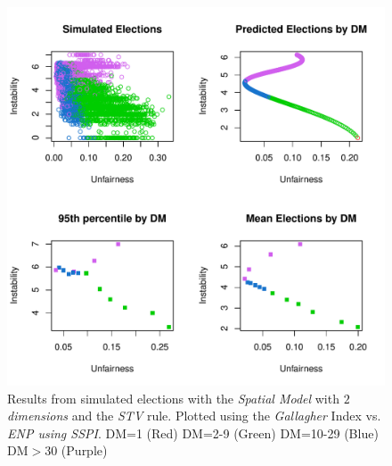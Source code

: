 \documentclass{article}
\begin{document}
\begin{figure}[]
\includegraphics[scale=1.00]{images/stv_spatial2_gallagher_enpsspi.pdf}
\caption{Results from simulated elections with the \emph{Spatial Model} with \emph{$2$ dimensions} and the \emph{STV} rule. Plotted using the \emph{Gallagher} Index vs. \emph{ENP using SSPI}. DM=1 (Red) DM=2-9 (Green) DM=10-29 (Blue) DM$>$30 (Purple)}
\label{fig:stv_spatial2_sspi}
\end{figure}
\end{document}
